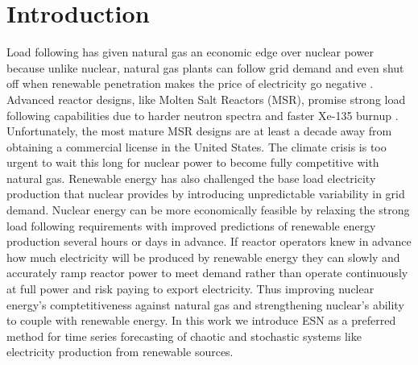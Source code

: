 \section{Introduction}

Load following has given natural gas an economic edge over nuclear power
because unlike nuclear,
natural gas plants can follow grid demand and even shut off when renewable
penetration makes the
price of electricity go negative \cite{keppler_carbon_2011}. Advanced reactor
designs, like Molten Salt
Reactors (MSR), promise strong load following capabilities due to harder
neutron spectra and faster Xe-135 burnup \cite{rykhlevskii_impact_2019}.
Unfortunately, the most mature MSR
designs are at least a decade away from obtaining a commercial license in the
United States. The climate crisis is too urgent to wait this long for nuclear
power to become fully competitive with natural gas.
Renewable energy has also challenged the base load electricity production that
nuclear provides by introducing unpredictable variability in grid demand.
Nuclear energy can be more economically feasible by relaxing the strong load
following requirements
with improved predictions of renewable energy production several hours or days
in advance. If reactor operators knew in advance how much electricity will be
produced by renewable energy they
can slowly and accurately ramp reactor power to meet demand rather than operate
continuously at full power and risk paying to export electricity. Thus
improving nuclear energy's comptetitiveness against natural gas and
strengthening nuclear's ability to couple with renewable energy.
In this work we introduce \acrfull{ESN} as a preferred method for time 
series forecasting of chaotic and stochastic systems like electricity
production from renewable sources.
